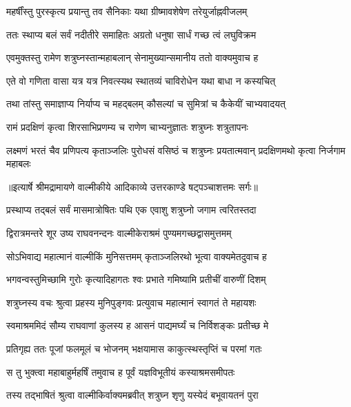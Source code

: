 \twolineshloka
{महर्षींस्तु पुरस्कृत्य प्रयान्तु तव सैनिकाः}
{यथा ग्रीष्मावशेषेण तरेयुर्जाह्नवीजलम्} %

\twolineshloka
{ततः स्थाप्य बलं सर्वं नदीतीरे समाहितः}
{अग्रतो धनुषा सार्धं गच्छ त्वं लघुविक्रम} %

\twolineshloka
{एवमुक्तस्तु रामेण शत्रुघ्नस्तान्महाबलान्}
{सेनामुख्यान्समानीय ततो वाक्यमुवाच ह} %

\twolineshloka
{एते वो गणिता वासा यत्र यत्र निवत्स्यथ}
{स्थातव्यं चाविरोधेन यथा बाधा न कस्यचित्} %

\twolineshloka
{तथा तांस्तु समाज्ञाप्य निर्याप्य च महद्बलम्}
{कौसल्यां च सुमित्रां च कैकेयीं चाभ्यवादयत्} %

\twolineshloka
{रामं प्रदक्षिणं कृत्वा शिरसाभिप्रणम्य च}
{राणेण चाभ्यनुज्ञातः शत्रुघ्नः शत्रुतापनः} %

\threelineshloka
{लक्ष्मणं भरतं चैव प्रणिपत्य कृताञ्जलिः}
{पुरोधसं वसिष्ठं च शत्रुघ्नः प्रयतात्मवान्}
{प्रदक्षिणमथो कृत्वा निर्जगाम महाबलः} %


{॥इत्यार्षे श्रीमद्रामायणे वाल्मीकीये आदिकाव्ये उत्तरकाण्डे षट्पञ्चाशत्तमः सर्गः॥}


\twolineshloka
{प्रस्थाप्य तद्बलं सर्वं मासमात्रोषितः पथि}
{एक एवाशु शत्रुघ्नो जगाम त्वरितस्तदा} %

\twolineshloka
{द्विरात्रमन्तरे शूर उष्य राघवनन्दनः}
{वाल्मीकेराश्रमं पुण्यमगच्छद्वासमुत्तमम्} %

\twolineshloka
{सोऽभिवाद्य महात्मानं वाल्मीकिं मुनिसत्तमम्}
{कृताञ्जलिरथो भूत्वा वाक्यमेतदुवाच ह} %

\twolineshloka
{भगवन्वस्तुमिच्छामि गुरोः कृत्यादिहागतः}
{श्वः प्रभाते गमिष्यामि प्रतीचीं वारुणीं दिशम्} %

\twolineshloka
{शत्रुघ्नस्य वचः श्रुत्वा प्रहस्य मुनिपुङ्गवः}
{प्रत्युवाच महात्मानं स्वागतं ते महायशः} %

\twolineshloka
{स्वमाश्रममिदं सौम्य राघवाणां कुलस्य ह}
{आसनं पाद्यमर्घ्यं च निर्विशङ्कः प्रतीच्छ मे} %

\twolineshloka
{प्रतिगृह्य ततः पूजां फलमूलं च भोजनम्}
{भक्षयामास काकुत्स्थस्तृप्तिं च परमां गतः} %

\twolineshloka
{स तु भुक्त्वा महाबाहुर्महर्षिं तमुवाच ह}
{पूर्वं यज्ञविभूतीयं कस्याश्रमसमीपतः} %

\twolineshloka
{तस्य तद्भाषितं श्रुत्वा वाल्मीकिर्वाक्यमब्रवीत्}
{शत्रुघ्न शृणु यस्येदं बभूवायतनं पुरा} %

